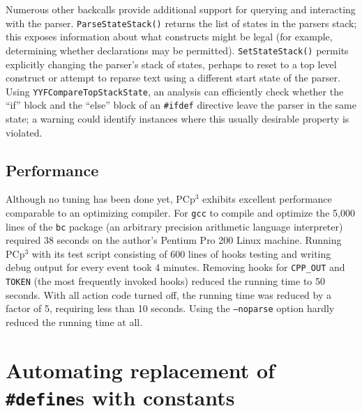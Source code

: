 \documentclass{article}
\newcommand{\pcp}{\mbox{\textsf{PCp}$^3$}}
\newcommand{\ppd}[1]{\texttt{\##1}}
\begin{document}
Numerous other backcalls provide additional support for querying and
interacting with the parser.  \texttt{ParseStateStack()} returns the
list of states in the parsers stack; this exposes information about
what constructs might be legal (for example, determining whether
declarations may be permitted).  \texttt{SetStateStack()} permits
explicitly changing the parser's stack of states, perhaps to reset to a
top level construct or attempt to reparse text using a different start
state of the parser.  Using \texttt{YYFCompareTopStackState}, an
analysis can efficiently check whether the ``if'' block and the ``else''
block of an \ppd{ifdef} directive leave the parser in the same state;
a warning could identify instances where this usually desirable
property is violated.





\subsection{Performance}

Although no tuning has been done yet, \pcp{} exhibits excellent
performance comparable to an optimizing compiler.  For \texttt{gcc} to
compile and optimize the 5,000 lines of the \texttt{bc} package (an
arbitrary precision arithmetic language interpreter) required 38 seconds
on the author's Pentium Pro 200 Linux machine. Running \pcp{} with its
test script consisting of 600 lines of hooks testing and writing debug
output for every event took 4 minutes.  Removing hooks for
\texttt{CPP\_OUT} and \texttt{TOKEN} (the most frequently invoked hooks)
reduced the running time to 50 seconds.  With all action code turned
off, the running time was reduced by a factor of 5, requiring less than
10 seconds.  Using the \texttt{--noparse} option hardly reduced the
running time at all.

\section{Automating replacement of \ppd{define}s with constants}
\label{sec:xform}
\end{document}
